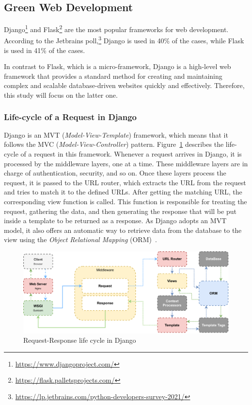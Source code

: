 \subsection{Green Web Development}\label{sec:webdev}

Django\footnote{\url{https://www.djangoproject.com/}} and Flask\footnote{\url{https://flask.palletsprojects.com/}} are the most popular frameworks for web development.
According to the Jetbrains poll,\footnote{\url{https://lp.jetbrains.com/python-developers-survey-2021/}} Django is used in 40\% of the cases, while Flask is used in 41\% of the cases.

In contrast to Flask, which is a micro-framework, Django is a high-level web framework that provides a standard method for creating and maintaining complex and scalable database-driven websites quickly and effectively.
Therefore, this study will focus on the latter one.

\subsubsection{Life-cycle of a Request in Django}
Django is an MVT (\emph{Model-View-Template}) framework, which means that it follows the MVC (\emph{Model-View-Controller}) pattern.
Figure~\ref{fig:django-life-cycle} describes the life-cycle of a request in this framework.
Whenever a request arrives in Django, it is processed by the middleware layers, one at a time.
These middleware layers are in charge of authentication, security, and so on.
Once these layers process the request, it is passed to the URL router, which extracts the URL from the request and tries to match it to the defined URLs.
After getting the matching URL, the corresponding view function is called.
This function is responsible for treating the request, gathering the data, and then generating the response that will be put inside a template to be returned as a response.
As Django adopts an MVT model, it also offers an automatic way to retrieve data from the database to the view using the \emph{Object Relational Mapping} (ORM)~\cite{o2008object}.

\begin{figure}[!htb]
    \centering
    \includegraphics[width=\linewidth]{imgs/django_request_lifecycle}
    \caption{Request-Response life cycle in Django}
    \label{fig:django-life-cycle}
\end{figure}

